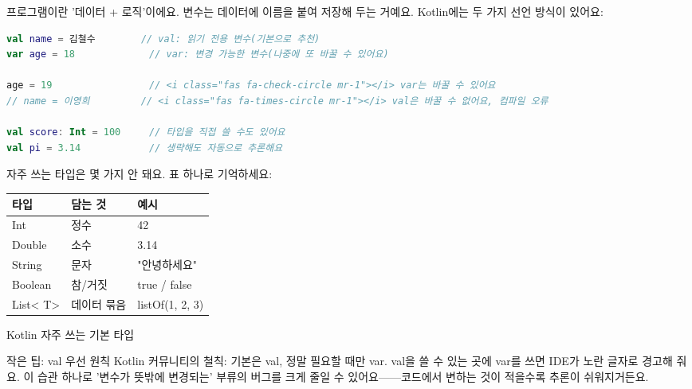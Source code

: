 


프로그램이란 '데이터 + 로직'이에요. 변수는 데이터에 이름을 붙여 저장해 두는 거예요. Kotlin에는 두 가지 선언 방식이 있어요:

\begin{lstlisting}[language=Kotlin]
val name = 김철수        // val: 읽기 전용 변수(기본으로 추천)
var age = 18             // var: 변경 가능한 변수(나중에 또 바꿀 수 있어요)

age = 19                 // <i class="fas fa-check-circle mr-1"></i> var는 바꿀 수 있어요
// name = 이영희         // <i class="fas fa-times-circle mr-1"></i> val은 바꿀 수 없어요, 컴파일 오류

val score: Int = 100     // 타입을 직접 쓸 수도 있어요
val pi = 3.14            // 생략해도 자동으로 추론해요
\end{lstlisting}

자주 쓰는 타입은 몇 가지 안 돼요. 표 하나로 기억하세요:

\begin{center}
\begin{tabularx}{\linewidth}{|X|X|X|}
\hline
\textbf{타입} & \textbf{담는 것} & \textbf{예시} \tabularnewline
\hline
Int & 정수 & 42 \tabularnewline
Double & 소수 & 3.14 \tabularnewline
String & 문자 & "안녕하세요" \tabularnewline
Boolean & 참/거짓 & true / false \tabularnewline
List< T> & 데이터 묶음 & listOf(1, 2, 3) \tabularnewline
\hline
\end{tabularx}
\end{center}

\begin{center}\small\color{gray}Kotlin 자주 쓰는 기본 타입\end{center}

\begin{tcbinfo}{작은 팁: val 우선 원칙}
Kotlin 커뮤니티의 철칙: 기본은 val, 정말 필요할 때만 var. val을 쓸 수 있는 곳에 var를 쓰면 IDE가 노란 글자로 경고해 줘요. 이 습관 하나로 '변수가 뜻밖에 변경되는' 부류의 버그를 크게 줄일 수 있어요——코드에서 변하는 것이 적을수록 추론이 쉬워지거든요.

\end{tcbinfo}

